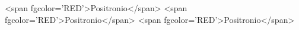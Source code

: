 \documentclass[preview]{standalone}
\begin{document}
\begin{center}
<span fgcolor='RED'>Positronio</span> 
 <span fgcolor='RED'>Positronio</span> 
 <span fgcolor='RED'>Positronio</span>
\end{center}
\end{document}
